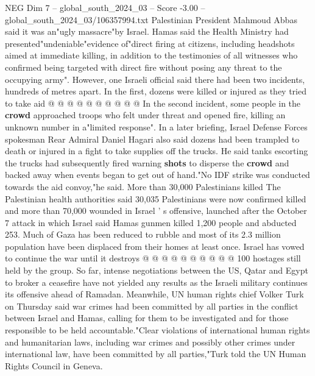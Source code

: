 \begin{textsample}{NEG Dim 7 – global\_south\_2024\_03 – Score -3.00 – global\_south\_2024\_03/106357994.txt}
Palestinian President Mahmoud Abbas said it was an"ugly massacre"by Israel.
Hamas said the Health Ministry had presented"undeniable"evidence of"direct firing at citizens, including headshots aimed at immediate killing, in addition to the testimonies of all witnesses who confirmed being targeted with direct fire without posing any threat to the occupying army".
However, one Israeli official said there had been two incidents, hundreds of metres apart.
In the first, dozens were killed or injured as they tried to take aid @ @ @ @ @ @ @ @ @ @ In the second incident, some people in the \textbf{crowd} approached troops who felt under threat and opened fire, killing an unknown number in a"limited response".
In a later briefing, Israel Defense Forces spokesman Rear Admiral Daniel Hagari also said dozens had been trampled to death or injured in a fight to take supplies off the trucks.
He said tanks escorting the trucks had subsequently fired warning \textbf{shots} to disperse the \textbf{crowd} and backed away when events began to get out of hand."No IDF strike was conducted towards the aid convoy,"he said.
More than 30,000 Palestinians killed The Palestinian health authorities said 30,035 Palestinians were now confirmed killed and more than 70,000 wounded in Israel ' s offensive, launched after the October 7 attack in which Israel said Hamas gunmen killed 1,200 people and abducted 253.
Much of Gaza has been reduced to rubble and most of its 2.3 million population have been displaced from their homes at least once.
Israel has vowed to continue the war until it destroys @ @ @ @ @ @ @ @ @ @ 100 hostages still held by the group.
So far, intense negotiations between the US, Qatar and Egypt to broker a ceasefire have not yielded any results as the Israeli military continues its offensive ahead of Ramadan.
Meanwhile, UN human rights chief Volker Turk on Thursday said war crimes had been committed by all parties in the conflict between Israel and Hamas, calling for them to be investigated and for those responsible to be held accountable."Clear violations of international human rights and humanitarian laws, including war crimes and possibly other crimes under international law, have been committed by all parties,"Turk told the UN Human Rights Council in Geneva.

\end{textsample}
